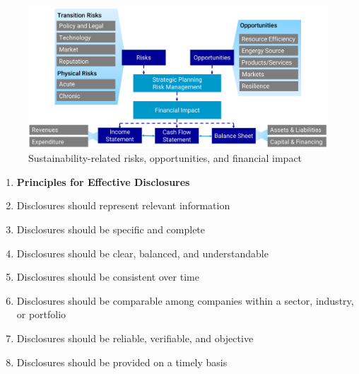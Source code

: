 \documentclass[11pt]{article}
\theoremstyle{definition}
\begin{document}
\begin{figure}[H]
	\centering
	\includegraphics[width=0.8\linewidth]{img/sustainability_risks_opportunities_impact}
	\caption{Sustainability-related risks, opportunities, and financial impact}
	\label{fig:sustainabilityrisksopportunitiesimpact}
\end{figure}

\begin{enumerate}
	\item[] \textbf{Principles for Effective Disclosures}
	\item Disclosures should represent relevant information
	\item Disclosures should be specific and complete
	\item Disclosures should be clear, balanced, and understandable
	\item Disclosures should be consistent over time
	\item Disclosures should be comparable among companies within a sector, industry, or portfolio
	\item Disclosures should be reliable, verifiable, and objective
	\item Disclosures should be provided on a timely basis
\end{enumerate}
\end{document}
